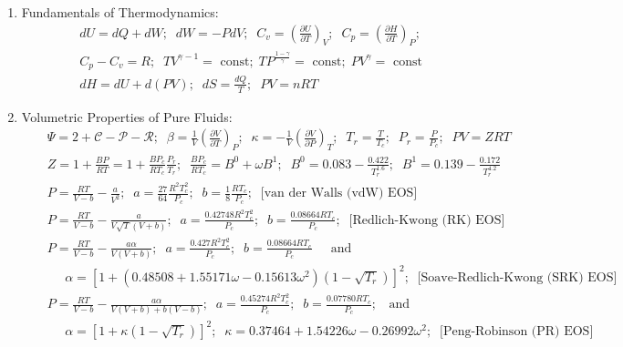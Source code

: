 \documentclass[12pts,a4paper,amsmath,amssymb,floatfix]{article}%
\newcommand{\frc}{\displaystyle\frac}
\newcommand{\Partial}[3][error]{\left(\frc{\partial #1}{\partial #2}\right)_{#3}}
\begin{document}
\begin{enumerate}[1.]
\item Fundamentals of Thermodynamics:
  \begin{eqnarray}
    && dU = dQ + dW;\;\;dW = -PdV;\;\; C_{v}=\Partial[U]{T}{V};\;\;C_{p} = \Partial[H]{T}{P};\nonumber \\
    && C_{p}-C_{v} = R;\;\; TV^{\gamma-1} =\text{ const};\; TP^{\frac{1-\gamma}{\gamma}}=\text{ const};\; PV^{\gamma}=\text{ const} \nonumber \\
    && dH = dU + d(PV);\;\; dS = \frc{dQ}{T};\;\; PV = nRT \nonumber
  \end{eqnarray}
  
  \item Volumetric Properties of Pure Fluids:
  \begin{eqnarray}
    && \Psi = 2 + \mathcal{C} - \mathcal{P} -\mathcal{R};\;\; \beta = \frc{1}{V}\Partial[V]{T}{P};\;\; \kappa = -\frc{1}{V}\Partial[V]{P}{T};\;\;T_{r} = \frc{T}{T_{c}};\;\; P_{r} = \frc{P}{P_{c}};\;\; PV=ZRT \nonumber \\
    &&  Z = 1 + \frc{B P}{R T} = 1 + \frc{B P_{c}}{R T_{c}}\frc{P_{r}}{T_{r}};\;\; \frc{B P_{c}}{R T_{c}} = B^{0} + \omega B^{1};\;\; B^{0} = 0.083 - \frc{0.422}{T_{r}^{1.6}}; \;\; B^{1} = 0.139 - \frc{0.172}{T_{r}^{4.2}} \nonumber \\
    && P = \frc{R T}{V-b} - \frc{a}{V^{2}};\;\;a = \frc{27}{64}\frc{R^{2}T_{c}^{2}}{P_{c}};\;\; b = \frc{1}{8}\frc{R T_{c}}{P_{c}};\;\; \text{[van der Walls (vdW) EOS]} \nonumber \\
    && P = \frc{R T}{V-b} - \frc{a}{V\sqrt{T}\left(V+b\right)};\;\;a = \frc{0.42748 R^{2}T_{c}^{2}}{P_{c}};\;\; b = \frc{0.08664 R T_{c} }{P_{c}};\;\;\text{[Redlich-Kwong (RK) EOS]}  \nonumber \\
    && P = \frc{R T}{V-b} - \frc{a\alpha}{V\left(V+b\right)};\;\; a = \frc{0.427 R^{2}T_{c}^{2}}{P_{c}};\;\; b = \frc{0.08664 R T_{c} }{P_{c}}\;\;\;\;\text{ and } \nonumber \\
    && \;\;\;\;\; \alpha = \left[1 + \left( 0.48508 + 1.55171\omega - 0.15613\omega^{2}\right)\left(1-\sqrt{T_{r}}\right)\right]^{2}; \;\;\text{[Soave-Redlich-Kwong (SRK) EOS]}  \nonumber \\
    && P = \frc{R T}{V-b} - \frc{a\alpha}{V\left(V+b\right)+b\left(V-b\right)};\;\; a = \frc{0.45274 R^{2}T_{c}^{2}}{P_{c}};\;\;b = \frc{0.07780 R T_{c} }{P_{c}};\;\;\text{ and } \nonumber \\
    &&\;\;\;\;\;\alpha = \left[1 + \kappa\left(1-\sqrt{T_{r}}\right)\right]^{2};\;\; \kappa = 0.37464 + 1.54226\omega - 0.26992\omega^{2};\;\; \text{[Peng-Robinson (PR) EOS]}  \nonumber \\

\end{eqnarray}
\end{enumerate}
\end{document}
